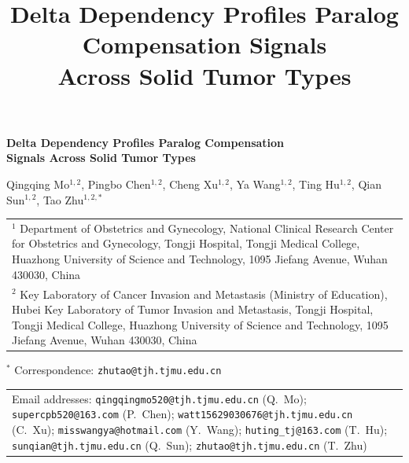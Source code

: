 \documentclass[11pt,a4paper]{article}
\title{\textbf{Delta Dependency Profiles Paralog Compensation Signals\\Across Solid Tumor Types}}
\author{}
\date{}
\begin{document}
\begin{center}
{\LARGE\bfseries Delta Dependency Profiles Paralog Compensation\\[0.3em] Signals Across Solid Tumor Types\par}
\vspace{1.5em}

{\large Qingqing Mo$^{1,2}$, Pingbo Chen$^{1,2}$, Cheng Xu$^{1,2}$, Ya Wang$^{1,2}$, Ting Hu$^{1,2}$, Qian Sun$^{1,2}$, Tao Zhu$^{1,2,\ast}$\par}
\vspace{0.8em}

{\small
\begin{tabular}{p{}}
$^{1}$ Department of Obstetrics and Gynecology, National Clinical Research Center for Obstetrics and Gynecology, Tongji Hospital, Tongji Medical College, Huazhong University of Science and Technology, 1095 Jiefang Avenue, Wuhan 430030, China\\[0.4em]
$^{2}$ Key Laboratory of Cancer Invasion and Metastasis (Ministry of Education), Hubei Key Laboratory of Tumor Invasion and Metastasis, Tongji Hospital, Tongji Medical College, Huazhong University of Science and Technology, 1095 Jiefang Avenue, Wuhan 430030, China
\end{tabular}\par}
\vspace{0.8em}

{\small $^{\ast}$ Correspondence: \texttt{zhutao@tjh.tjmu.edu.cn}\par}
\vspace{0.4em}

{\footnotesize
\begin{tabular}{p{}}
Email addresses: \texttt{qingqingmo520@tjh.tjmu.edu.cn} (Q.~Mo); \texttt{supercpb520@163.com} (P.~Chen); \texttt{watt15629030676@tjh.tjmu.edu.cn} (C.~Xu); \texttt{misswangya@hotmail.com} (Y.~Wang); \texttt{huting\_tj@163.com} (T.~Hu); \texttt{sunqian@tjh.tjmu.edu.cn} (Q.~Sun); \texttt{zhutao@tjh.tjmu.edu.cn} (T.~Zhu)
\end{tabular}\par}
\end{center}

\vspace{1em}
\end{document}
